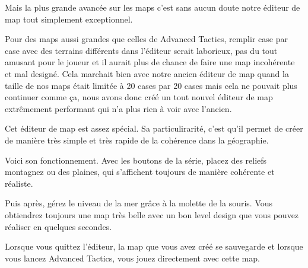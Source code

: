 \documentclass{article}
\begin{document}
\par
Mais la plus grande avancée sur les maps c'est sans aucun doute notre éditeur de map tout simplement exceptionnel.
\newline

\par
Pour des maps aussi grandes que celles de Advanced Tactics, remplir case par case avec des terrains différents dans l'éditeur serait laborieux, pas du tout amusant pour le joueur et il aurait plus de chance de faire une map incohérente et mal designé. Cela marchait bien avec notre ancien éditeur de map
quand la taille de nos maps était limitée à 20 cases par 20 cases mais cela ne pouvait plus continuer comme ça, nous avons donc créé un tout nouvel éditeur de map extrêmement performant qui n'a plus rien à voir avec l'ancien.
\newline

\par
Cet éditeur de map est assez spécial. Sa particulirarité, c'est qu'il permet de créer de manière très simple et très rapide de la cohérence dans la géographie.
\newline

\par
Voici son fonctionnement. Avec les boutons de la série, placez des reliefs montagnez ou des plaines, qui s'affichent toujours de manière cohérente et réaliste.
\newline

\par
Puis après, gérez le niveau de la mer grâce à la molette de la souris. Vous obtiendrez toujours une map très belle avec un bon level design que vous pouvez réaliser en quelques secondes.
\newline

\par
Lorsque vous quittez l'éditeur, la map que vous avez créé se sauvegarde et lorsque vous lancez Advanced Tactics, vous jouez directement avec cette map.
\newline

\newpage
\end{document}
